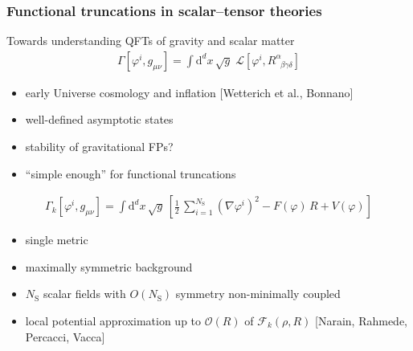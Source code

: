 \documentclass[]{beamer}  %
\newcommand\NS{ N_{\scriptscriptstyle{\mathrm{S}}} }
\begin{document}


\begin{frame}
  \frametitle{Functional truncations in scalar--tensor theories}

  Towards understanding QFTs of gravity and scalar matter
  \begin{align*}
      \Gamma[\varphi^i,g_{\mu\nu}]
      = \int \mathrm{d}^dx \, \sqrt{g} \; \mathcal{L}[\varphi^i,R^{\alpha}_{\;\;\beta\gamma\delta}]
  \end{align*}
  \begin{itemize}
    \item early Universe cosmology and inflation [Wetterich et al., Bonnano]
    \item well-defined asymptotic states
    \item stability of gravitational FPs?
    \item ``simple enough'' for functional truncations
  \end{itemize}

  \begin{align*}
    \boxed{
      \Gamma_k [\varphi^i,g_{\mu\nu}] =
      \int \mathrm d^dx \, \sqrt{g} \,
      \left[
          \frac{1}{2} \, \sum_{i=1}^{\NS} \left( \nabla\varphi^i \right)^2
        - F(\varphi) \, R
        + V(\varphi)
      \right]
    }
  \end{align*}

  \begin{itemize}
    \item single metric
    \item maximally symmetric background
    \item $\NS$ scalar fields with $O(\NS)$ symmetry non-minimally coupled
    \item local potential approximation up to $\mathcal O(R)$ of $\mathcal F_k(\rho, R)$
  \hfill[Narain, Rahmede, Percacci, Vacca]
  \end{itemize}
\end{frame}


\end{document}
